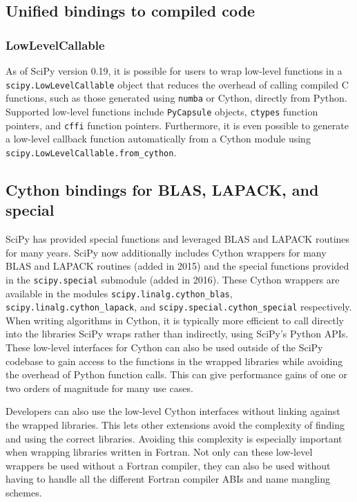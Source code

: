 \documentclass[fleqn,10pt]{wlscirep}
\begin{document}


\subsection*{Unified bindings to compiled code}

\subsubsection*{LowLevelCallable}

As of SciPy version 0.19, it is possible for users to wrap low-level functions
in a \texttt{scipy.LowLevelCallable} object that reduces the overhead of
calling compiled C functions, such as those generated using \texttt{numba}
or Cython, directly from Python.
Supported low-level functions include \texttt{PyCapsule}
objects, \texttt{ctypes} function pointers, and \texttt{cffi} function pointers.
Furthermore, it is even possible to generate a low-level callback function
automatically from a Cython module using \texttt{scipy.LowLevelCallable.from\_cython}.

\subsection*{Cython bindings for BLAS, LAPACK, and special}

SciPy has provided special functions and leveraged BLAS and
LAPACK\cite{LAPACK} routines for many years. SciPy now additionally
includes Cython\cite{behnel2011cython} wrappers for
many BLAS and LAPACK routines (added in 2015) and the special functions 
provided in the \texttt{scipy.{\allowbreak}special} submodule (added in 2016).  
These Cython wrappers are available in the modules
\texttt{scipy.{\allowbreak}linalg.{\allowbreak}cython\_blas},
\texttt{scipy.{\allowbreak}linalg.{\allowbreak}cython\_lapack}, and
\texttt{scipy.{\allowbreak}special.{\allowbreak}cython\_special} respectively.
When writing algorithms in Cython, it is typically more efficient to call
directly into the libraries SciPy wraps rather than indirectly, using SciPy's
Python APIs.  These low-level interfaces for Cython can also be used outside of
the SciPy codebase to gain access to the functions in the wrapped libraries
while avoiding the overhead of Python function calls.  This can give
performance gains of one or two orders of magnitude for many use cases.

Developers can also use the low-level Cython interfaces without linking against
the wrapped libraries\cite{blas-lapack-wrappers-scipy-2015}.  This lets other
extensions avoid the complexity of finding and using the correct libraries.
Avoiding this complexity is especially important when wrapping libraries
written in Fortran.  Not only can these low-level wrappers be used without a
Fortran compiler, they can also be used without having to handle all the
different Fortran compiler ABIs and name mangling schemes.
\end{document}
